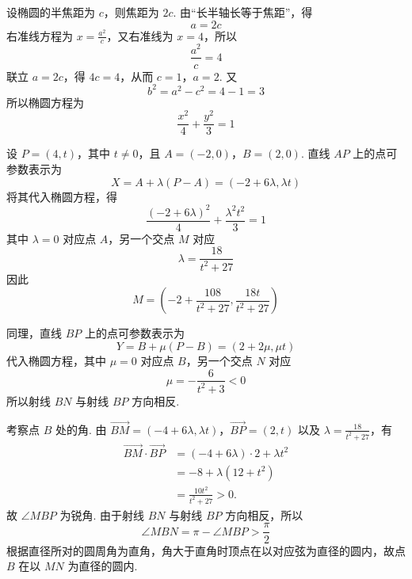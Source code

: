 \begin{solution}
设椭圆的半焦距为 \(c\)，则焦距为 \(2c\). 由“长半轴长等于焦距”，得
\[
a=2c
\]
右准线方程为 \(x=\frac{a^2}{c}\)，又右准线为 \(x=4\)，所以
\[
\frac{a^2}{c}=4
\]
联立 \(a=2c\)，得 \(4c=4\)，从而 \(c=1\)，\(a=2\). 又
\[
b^2=a^2-c^2=4-1=3
\]
所以椭圆方程为
\[
\frac{x^2}{4}+\frac{y^2}{3}=1
\]

设 \(P=(4,t)\)，其中 \(t\ne0\)，且 \(A=(-2,0)\)，\(B=(2,0)\). 直线 \(AP\) 上的点可参数表示为
\[
X=A+\lambda(P-A)=(-2+6\lambda,\lambda t)
\]
将其代入椭圆方程，得
\[
\frac{(-2+6\lambda)^2}{4}+\frac{\lambda^2t^2}{3}=1
\]
其中 \(\lambda=0\) 对应点 \(A\)，另一个交点 \(M\) 对应
\[
\lambda=\frac{18}{t^2+27}
\]
因此
\[
M=\left(-2+\frac{108}{t^2+27},\frac{18t}{t^2+27}\right)
\]

同理，直线 \(BP\) 上的点可参数表示为
\[
Y=B+\mu(P-B)=(2+2\mu,\mu t)
\]
代入椭圆方程，其中 \(\mu=0\) 对应点 \(B\)，另一个交点 \(N\) 对应
\[
\mu=-\frac{6}{t^2+3}<0
\]
所以射线 \(BN\) 与射线 \(BP\) 方向相反.

考察点 \(B\) 处的角. 由
\(\overrightarrow{BM}=(-4+6\lambda,\lambda t)\)，\(\overrightarrow{BP}=(2,t)\)
以及 \(\lambda=\frac{18}{t^2+27}\)，有
\[
\begin{aligned}
\overrightarrow{BM}\cdot\overrightarrow{BP}
&=(-4+6\lambda)\cdot2+\lambda t^2\\
&=-8+\lambda(12+t^2)\\
&=\frac{10t^2}{t^2+27}>0.
\end{aligned}
\]
故 \(\angle MBP\) 为锐角. 由于射线 \(BN\) 与射线 \(BP\) 方向相反，所以
\[
\angle MBN=\pi-\angle MBP>\frac\pi2
\]
根据直径所对的圆周角为直角，角大于直角时顶点在以对应弦为直径的圆内，故点 \(B\) 在以 \(MN\) 为直径的圆内.
\end{solution}
